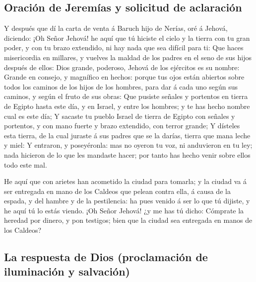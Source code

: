 \hypertarget{oraciuxf3n-de-jeremuxedas-y-solicitud-de-aclaraciuxf3n}{%
\subsection{Oración de Jeremías y solicitud de
aclaración}\label{oraciuxf3n-de-jeremuxedas-y-solicitud-de-aclaraciuxf3n}}

 Y después que dí la carta de venta á Baruch hijo de
Nerías, oré á Jehová, diciendo:  ¡Oh Señor Jehová! he
aquí que tú hiciste el cielo y la tierra con tu gran poder, y con tu
brazo extendido, ni hay nada que sea difícil para ti: 
Que haces misericordia en millares, y vuelves la maldad de los padres en
el seno de sus hijos después de ellos: Dios grande, poderoso, Jehová de
los ejércitos es su nombre:  Grande en consejo, y
magnífico en hechos: porque tus ojos están abiertos sobre todos los
caminos de los hijos de los hombres, para dar á cada uno según sus
caminos, y según el fruto de sus obras:  Que pusiste
señales y portentos en tierra de Egipto hasta este día, y en Israel, y
entre los hombres; y te has hecho nombre cual es este día;
 Y sacaste tu pueblo Israel de tierra de Egipto con
señales y portentos, y con mano fuerte y brazo extendido, con terror
grande;  Y dísteles esta tierra, de la cual juraste á sus
padres que se la darías, tierra que mana leche y miel:  Y
entraron, y poseyéronla: mas no oyeron tu voz, ni anduvieron en tu ley;
nada hicieron de lo que les mandaste hacer; por tanto has hecho venir
sobre ellos todo este mal.

 He aquí que con arietes han acometido la ciudad para
tomarla; y la ciudad va á ser entregada en mano de los Caldeos que
pelean contra ella, á causa de la espada, y del hambre y de la
pestilencia: ha pues venido á ser lo que tú dijiste, y he aquí tú lo
estás viendo.  ¡Oh Señor Jehová! ¿y me has tú dicho:
Cómprate la heredad por dinero, y pon testigos; bien que la ciudad sea
entregada en manos de los Caldeos?

\hypertarget{la-respuesta-de-dios-proclamaciuxf3n-de-iluminaciuxf3n-y-salvaciuxf3n}{%
\subsection{La respuesta de Dios (proclamación de iluminación y
salvación)}\label{la-respuesta-de-dios-proclamaciuxf3n-de-iluminaciuxf3n-y-salvaciuxf3n}}

